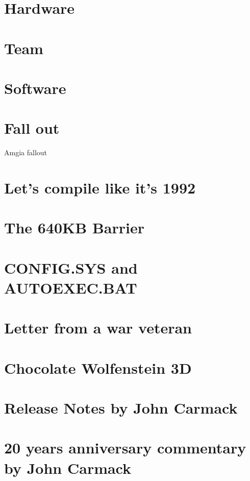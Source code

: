 \documentclass[12pt]{book}
\begin{document}
    \chapter{Hardware}
      
    \chapter{Team}
      
    \chapter{Software}
       
    \chapter{Fall out}
        

        Amgia fallout

    \appendix
    \appendixpage

    \chapter{Let's compile like it's 1992}
    \chapter{The 640KB Barrier}\label{chap:barrier640}
    \chapter{CONFIG.SYS and AUTOEXEC.BAT}
    \chapter{Letter from a war veteran}
    \chapter{Chocolate Wolfenstein 3D}
    \chapter{Release Notes by John Carmack}
    \chapter{20 years anniversary commentary by John Carmack}
\end{document}
